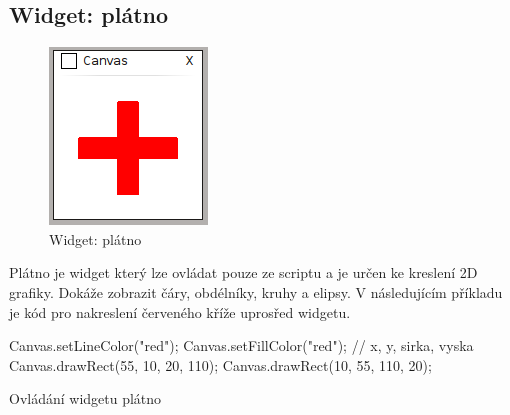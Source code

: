 \documentclass[12pt, a4paper, oneside]{article}
\begin{document}
\subsection{Widget: plátno}
\begin{figure}[H]
\begin{center}
\includegraphics[scale=1]{img/w_canvas.png}
\caption{Widget: plátno}
\end{center}
\end{figure}
Plátno je widget který lze ovládat pouze ze scriptu a je určen ke kreslení 2D grafiky. Dokáže zobrazit čáry, obdélníky, kruhy a elipsy. V následujícím příkladu je kód pro nakreslení červeného kříže uprosřed widgetu.

\begin{listing}[H]
\begin{jscode}
Canvas.setLineColor("red");
Canvas.setFillColor("red");
// x, y, sirka, vyska
Canvas.drawRect(55, 10, 20, 110);
Canvas.drawRect(10, 55, 110, 20);
\end{jscode}
\caption{Ovládání widgetu plátno}
\end{listing}
\end{document}

